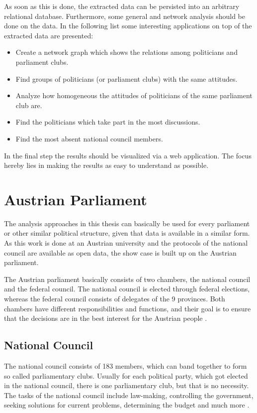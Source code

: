 As soon as this is done, the extracted data can be persisted into an arbitrary relational database. Furthermore, some general and network analysis should be done on the data. In the following list some interesting applications on top of the extracted data are presented:
\begin{itemize}
  \item Create a network graph which shows the relations among politicians and parliament clubs.
  \item Find groups of politicians (or parliament clubs) with the same attitudes.
  \item Analyze how homogeneous the attitudes of politicians of the same parliament club are.
  \item Find the politicians which take part in the most discussions.
  \item Find the most absent national council members.
\end{itemize}

In the final step the results should be visualized via a web application. The focus hereby lies in making the results as easy to understand as possible.

\section{Austrian Parliament}
The analysis approaches in this thesis can basically be used for every parliament or other similar political structure, given that data is available in a similar form. As this work is done at an Austrian university and the protocols of the national council are available as open data, the show case is built up on the Austrian parliament.

The Austrian parliament basically consists of two chambers, the national council and the federal council. The national council is elected through federal elections, whereas the federal council consists of delegates of the 9 provinces. Both chambers have different responsibilities and functions, and their goal is to ensure that the decisions are in the best interest for the Austrian people \cite{AustrianParliament_2015}.

\subsection{National Council}
The national council consists of 183 members, which can band together to form so called parliamentary clubs. Usually for each political party, which got elected in the national council, there is one parliamentary club, but that is no necessity. The tasks of the national council include law-making, controlling the government, seeking solutions for current problems, determining the budget and much more \cite{AustrianParliament_2015}. 

